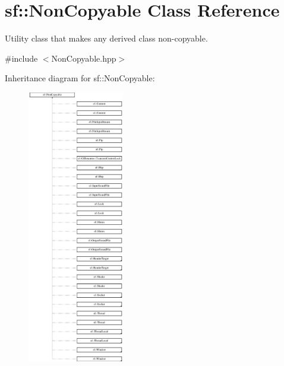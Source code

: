 \hypertarget{classsf_1_1_non_copyable}{\section{sf\-:\-:Non\-Copyable Class Reference}
\label{classsf_1_1_non_copyable}
}


Utility class that makes any derived class non-\/copyable.  




{\ttfamily \#include $<$Non\-Copyable.\-hpp$>$}

Inheritance diagram for sf\-:\-:Non\-Copyable\-:\begin{figure}[H]
\begin{center}
\leavevmode
\includegraphics[height=12.000000cm]{classsf_1_1_non_copyable}
\end{center}
\end{figure}
